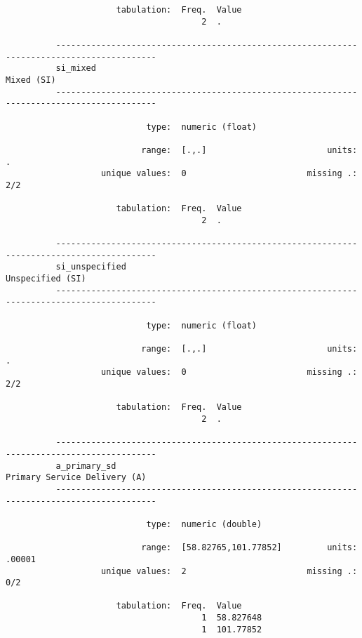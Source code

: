 \documentclass{article}
\begin{document}
\begin{verbatim}
                      tabulation:  Freq.  Value
                                       2  .
          
          ------------------------------------------------------------------------------------------
          si_mixed                                                                        Mixed (SI)
          ------------------------------------------------------------------------------------------
          
                            type:  numeric (float)
          
                           range:  [.,.]                        units:  .
                   unique values:  0                        missing .:  2/2
          
                      tabulation:  Freq.  Value
                                       2  .
          
          ------------------------------------------------------------------------------------------
          si_unspecified                                                            Unspecified (SI)
          ------------------------------------------------------------------------------------------
          
                            type:  numeric (float)
          
                           range:  [.,.]                        units:  .
                   unique values:  0                        missing .:  2/2
          
                      tabulation:  Freq.  Value
                                       2  .
          
          ------------------------------------------------------------------------------------------
          a_primary_sd                                                  Primary Service Delivery (A)
          ------------------------------------------------------------------------------------------
          
                            type:  numeric (double)
          
                           range:  [58.82765,101.77852]         units:  .00001
                   unique values:  2                        missing .:  0/2
          
                      tabulation:  Freq.  Value
                                       1  58.827648
                                       1  101.77852
          

\end{verbatim}
\end{document}
